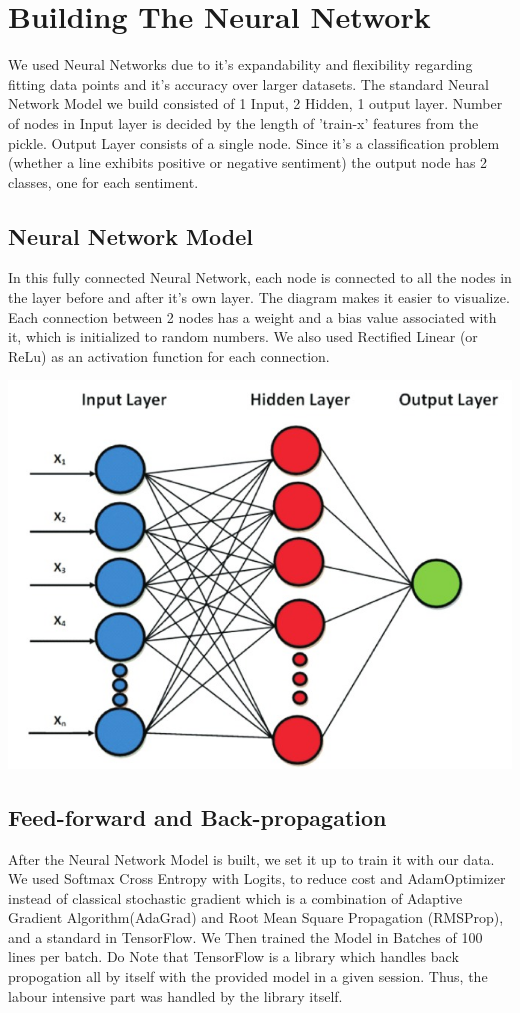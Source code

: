 \section{Building The Neural Network}
We used Neural Networks due to it's expandability and flexibility regarding fitting data points and it's accuracy over larger datasets. The standard Neural Network Model we build consisted of 1 Input, 2 Hidden, 1 output layer. Number of nodes in Input layer is decided by the length of 'train-x' features from the pickle. Output Layer consists of a single node. Since it's a classification problem (whether a line exhibits positive or negative sentiment) the output node has 2 classes, one for each sentiment.

\subsection{Neural Network Model}
In this fully connected Neural Network, each node is connected to all the nodes in the layer before and after it's own layer. The diagram makes it easier to visualize. Each connection between 2 nodes has a weight and a bias value associated with it, which is initialized to random numbers. We also used Rectified Linear (or ReLu) as an activation function for each connection. 

\includegraphics[scale=0.4]{Figures/nn_model.jpg}

\subsection{Feed-forward and Back-propagation}
After the Neural Network Model is built, we set it up to train it with our data. We used Softmax Cross Entropy with Logits, to reduce cost and AdamOptimizer instead of classical stochastic gradient which is a combination of Adaptive Gradient Algorithm(AdaGrad) and Root Mean Square Propagation (RMSProp), and a standard in TensorFlow. We Then trained the Model in Batches of 100 lines per batch. Do Note that TensorFlow is a library which handles back propogation all by itself with the provided model in a given session. Thus, the labour intensive part was handled by the library itself.

